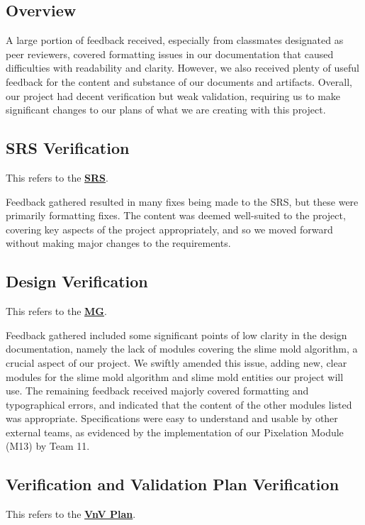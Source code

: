 \documentclass[12pt, titlepage]{article}
\begin{document}
\subsection{Overview}
A large portion of feedback received, especially from classmates designated as peer reviewers,
covered formatting issues in our documentation that caused difficulties with readability and clarity.
However, we also received plenty of useful feedback for the content and substance of our
documents and artifacts. Overall, our project had decent verification but weak validation,
requiring us to make significant changes to our plans of what we are creating with this project.

\subsection{SRS Verification}
This refers to the \href{https://github.com/felix-hurst/Ad-Natura/blob/main/docs/SRS/SRS.pdf}{\bf{SRS}}.

Feedback gathered resulted in many fixes being made to the SRS, but these were
primarily formatting fixes. The content was deemed well-suited to the project,
covering key aspects of the project appropriately, and so we moved forward
without making major changes to the requirements.

\subsection{Design Verification}
This refers to the \href{https://github.com/felix-hurst/Ad-Natura/blob/main/docs/Design/SoftArchitecture/MG.pdf}{\bf{MG}}.

Feedback gathered included some significant points of low clarity in the design
documentation, namely the lack of modules covering the slime mold algorithm, a
crucial aspect of our project. We swiftly amended this issue, adding new, clear
modules for the slime mold algorithm and slime mold entities our project will use.
The remaining feedback received majorly covered formatting and typographical errors,
and indicated that the content of the other modules listed was appropriate.
Specifications were easy to understand and usable by other external teams, as evidenced
by the implementation of our Pixelation Module (M13) by Team 11.

\subsection{Verification and Validation Plan Verification}
This refers to the \href{https://github.com/felix-hurst/Ad-Natura/blob/main/docs/VnVPlan/VnVPlan.pdf}{\bf{VnV Plan}}.
\end{document}
